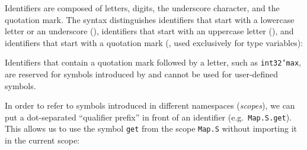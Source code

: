 Identifiers are composed of letters, digits, the underscore character,
and the quotation mark. %
The syntax distinguishes identifiers that start with a lowercase letter
or an underscore (\spacefalse), identifiers that
start with an uppercase letter (\spacefalse),
and identifiers that start with a quotation mark
(\spacefalse, used exclusively for type variables):
\begin{center}\end{center}
Identifiers that contain a quotation mark followed by a letter,
such as \texttt{int32'max}, are reserved for symbols
introduced by \why and cannot be used for user-defined symbols.

In order to refer to symbols introduced in different namespaces
(\textit{scopes}), we can put a dot-separated ``qualifier prefix''
in front of an identifier (e.g.~\texttt{Map.S.get}).
This allows us to use the symbol \texttt{get}
from the scope \texttt{Map.S} without importing
it in the current scope:
\begin{center}\end{center}

